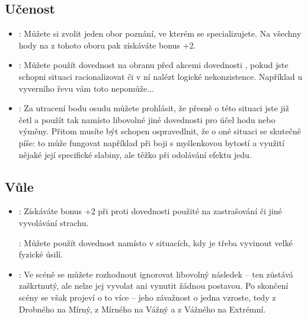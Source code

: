 \documentclass[../main.tex]{subfiles}
\begin{document}
\subsection{Učenost}
\label{sec:trik-ucenost}
\begin{itemize}
  
\item{}:
\label{sec:ucenost-specialista}
Můžete si zvolit jeden obor poznání, ve kterém se specializujete. Na všechny hody na  z tohoto oboru pak získáváte bonus +2.

\item{}:
\label{sec:ucenost-smysl}
Můžete použít dovednost  na obranu před akcemi dovednosti , pokud jste schopni situaci racionalizovat či v ní nalézt logické nekonzistence. Například u vyverního řevu vám toto nepomůže...

\item{}:
\label{sec:ucenost-cetl}
Za utracení bodu osudu můžete prohlásit, že přesně o této situaci jste již četl a použít tak  namísto libovolné jiné dovednosti pro účel hodu nebo výměny. Přitom musíte být schopen ospravedlnit, že o oné situaci se skutečně píše: to může fungovat například při boji s myšlenkovou bytostí a využití nějaké její specifické slabiny, ale těžko při odolávání efektu jedu.
\end{itemize}

\subsection{Vůle}
\label{sec:trik-vule}
\begin{itemize}
  
\item{}
\label{sec:vule-nebojsa}:
Získáváte bonus +2 při  proti dovednosti  použité na zastrašování či jiné vyvolávání strachu.

:
\label{sec:vule-duch}
Můžete použít dovednost  namísto  v situacích, kdy je třeba vyvinout velké fyzické úsilí.

\item{}:
\label{sec:vule-ublizit}
Ve scéně se můžete rozhodnout ignorovat libovolný následek – ten zůstává zaškrtnutý, ale nelze jej vyvolat ani vynutit žádnou postavou. Po skončení scény se však projeví o to více – jeho závažnost o jedna vzroste, tedy z Drobného na Mírný, z Mírného na Vážný a z Vážného na Extrémní.
\end{itemize}
\end{document}
